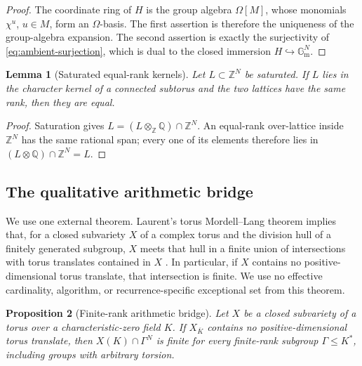 \documentclass[11pt]{article}
\newcommand{\Gm}{\mathbb{G}_{\mathrm m}}
\newcommand{\Z}{\mathbb{Z}}
\newcommand{\Q}{\mathbb{Q}}
\newcommand{\Om}{\Omega}
\newtheorem{lemma}{Lemma}[section]
\newtheorem{proposition}[lemma]{Proposition}
\theoremstyle{remark}
\numberwithin{equation}{section}
\begin{document}
\begin{proof}
The coordinate ring of \(H\) is the group algebra \(\Om[M]\), whose monomials \(\chi^u\), \(u\in M\), form an \(\Om\)-basis.  The first assertion is therefore the uniqueness of the group-algebra expansion.  The second assertion is exactly the surjectivity of \eqref{eq:ambient-surjection}, which is dual to the closed immersion \(H\hookrightarrow\Gm^N\).
\end{proof}

\begin{lemma}[Saturated equal-rank kernels]\label{lem:saturated-kernels}
Let \(L\subset\Z^N\) be saturated.  If \(L\) lies in the character kernel of a connected subtorus and the two lattices have the same rank, then they are equal.
\end{lemma}

\begin{proof}
Saturation gives \(L=(L\otimes_\Z\Q)\cap\Z^N\).  An equal-rank over-lattice inside \(\Z^N\) has the same rational span; every one of its elements therefore lies in \((L\otimes\Q)\cap\Z^N=L\).
\end{proof}

\subsection{The qualitative arithmetic bridge}

We use one external theorem.  Laurent's torus Mordell--Lang theorem implies that, for a closed subvariety \(X\) of a complex torus and the division hull of a finitely generated subgroup, \(X\) meets that hull in a finite union of intersections with torus translates contained in \(X\) \citep{laurent1984equations}.  In particular, if \(X\) contains no positive-dimensional torus translate, that intersection is finite.  We use no effective cardinality, algorithm, or recurrence-specific exceptional set from this theorem.

\begin{proposition}[Finite-rank arithmetic bridge]\label{prop:finite-rank-bridge}
Let \(X\) be a closed subvariety of a torus over a characteristic-zero field \(K\).  If \(X_{\overline K}\) contains no positive-dimensional torus translate, then \(X(K)\cap\Gamma^N\) is finite for every finite-rank subgroup \(\Gamma\leq K^\ast\), including groups with arbitrary torsion.
\end{proposition}
\end{document}
